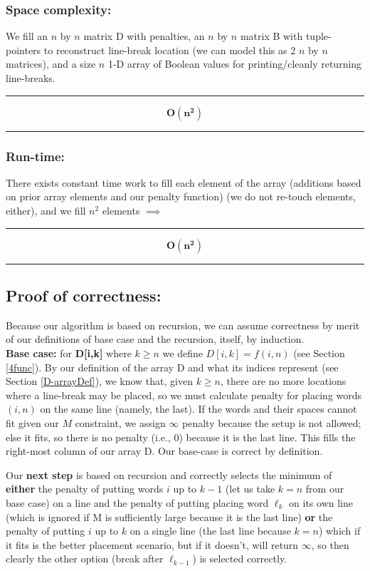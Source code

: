 \documentclass[conference]{styles/acmsiggraph}
\newcommand{\?}{\stackrel{?}{=}}
\begin{document}
\subsubsection*{Space complexity:}
We fill an $n$ by $n$ matrix D with penalties, an $n$ by $n$ matrix B with tuple-pointers to reconstruct line-break location (we can model this as 2 $n$ by $n$ matrices), and a size $n$ 1-D array of Boolean values for printing/cleanly returning line-breaks.\\
\rule{\textwidth}{0.4pt}
$$\mathbf{O(n^2)}$$
\rule{\textwidth}{0.4pt}

\subsubsection*{Run-time:}
There exists constant time work to fill each element of the array (additions based on prior array elements and our penalty function) (we do not re-touch elements, either), and we fill $n^2$ elements $\implies$ \\
\rule{\textwidth}{0.4pt}
$$\mathbf{O(n^2)}$$
\rule{\textwidth}{0.4pt}


\subsection{Proof of correctness:}
Because our algorithm is based on recursion, we can assume correctness by merit of our definitions of base case and the recursion, itself, by induction. \\

\textbf{Base case:} for \textbf{D[i,k]} where $k \geq n$ we define $D[i,k] = f(i,n)$ (see Section \ref{4func}).  By our definition of the array D and what its indices represent (see Section \ref{D-arrayDef}), we know that, given $k \geq n$, there are no more locations where a line-break may be placed, so we must calculate penalty for placing words $(i,n)$ on the same line (namely, the last).  If the words and their spaces cannot fit given our $M$ constraint, we assign $\infty$ penalty because the setup is not allowed; else it fits, so there is no penalty (i.e., $0$) because it is the last line.  This fills the right-most column of our array D.  Our base-case is correct by definition.

Our \textbf{next step} is based on recursion and correctly selects the minimum of \textbf{either} the penalty of putting words $i$ up to $k-1$ (let us take $k = n$ from our base case) on a line and the penalty of putting placing word $\ell_k$ on its own line (which is ignored if M is sufficiently large because it is the last line) \textbf{or} the penalty of putting $i$ up to $k$ on a single line (the last line because $k=n$) which if it fits is the better placement scenario, but if it doesn't, will return $\infty$, so then clearly the other option (break after $\ell_{k-1}$) is selected correctly.
\end{document}
